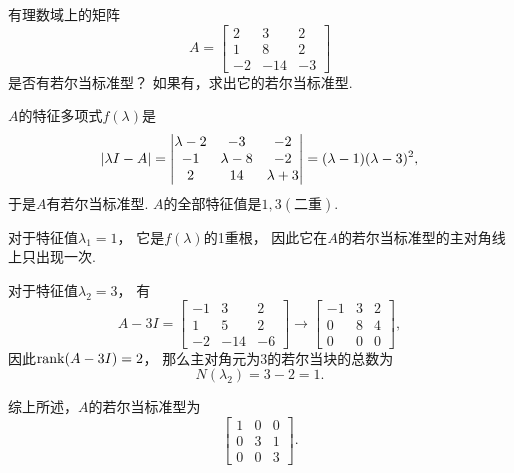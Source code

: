 \begin{example}
有理数域上的矩阵\begin{equation*}
	A = \begin{bmatrix}
		2 & 3 & 2 \\
		1 & 8 & 2 \\
		-2 & -14 & -3
	\end{bmatrix}
\end{equation*}是否有若尔当标准型？
如果有，求出它的若尔当标准型.
\begin{solution}
\(A\)的特征多项式\(f(\lambda)\)是\begin{equation*}
	\abs{\lambda I-A}
	= \begin{vmatrix}
		\lambda-2 & -3 & -2 \\
		-1 & \lambda-8 & -2 \\
		2 & 14 & \lambda+3
	\end{vmatrix}
	= (\lambda-1)(\lambda-3)^2,
\end{equation*}
于是\(A\)有若尔当标准型.
\(A\)的全部特征值是\(1,3(\text{二重})\).
\end{solution}

对于特征值\(\lambda_1=1\)，
它是\(f(\lambda)\)的1重根，
因此它在\(A\)的若尔当标准型的主对角线上只出现一次.

对于特征值\(\lambda_2=3\)，
有\begin{equation*}
	A-3I
	= \begin{bmatrix}
		-1 & 3 & 2 \\
		1 & 5 & 2 \\
		-2 & -14 & -6
	\end{bmatrix}
	\to \begin{bmatrix}
		-1 & 3 & 2 \\
		0 & 8 & 4 \\
		0 & 0 & 0
	\end{bmatrix},
\end{equation*}
因此\(\rank(A-3I)=2\)，
那么主对角元为\(3\)的若尔当块的总数为\begin{equation*}
	N(\lambda_2) = 3 - 2 = 1.
\end{equation*}

综上所述，\(A\)的若尔当标准型为\begin{equation*}
	\begin{bmatrix}
		1 & 0 & 0 \\
		0 & 3 & 1 \\
		0 & 0 & 3
	\end{bmatrix}.
\end{equation*}
\end{example}

